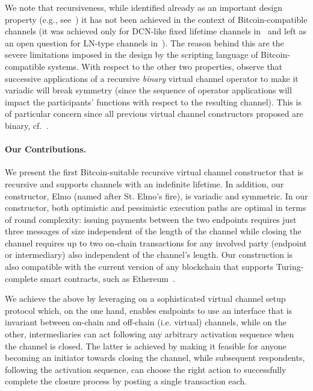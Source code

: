 We note that recursiveness, while identified already as an important design property (e.g., see~\cite{DBLP:conf/ccs/DziembowskiFH18}) it has not been achieved in the context of Bitcoin-compatible channels 
(it was achieved only for DCN-like fixed lifetime channels in~\cite{10.1007/978-3-030-65411-5_18} and left as an open question for LN-type channels in~\cite{cryptoeprint:2020:554}). 
The reason behind this are the severe limitations imposed in the design by the scripting language of Bitcoin-compatible systems. 
%
With respect to the other two properties, observe that successive applications of a recursive {\em binary} virtual channel operator to make it variadic will break symmetry (since the sequence of operator applications will impact the participants' functions with respect to the resulting channel). This is of particular concern since all previous virtual channel constructors proposed are binary, cf.~\cite{DBLP:conf/ccs/DziembowskiFH18,cryptoeprint:2020:554,10.1007/978-3-030-65411-5_18}. 

\paragraph{Our Contributions.}  We present  the first  Bitcoin-suitable
recursive virtual channel constructor that is recursive and supports channels
with an indefinite lifetime. In addition, our constructor, Elmo (named after St.
Elmo's fire), is variadic and symmetric. In our constructor, both optimistic and pessimistic execution paths are optimal in terms of round complexity: issuing payments between the two endpoints requires just three messages of size independent of the length of the channel while
closing the channel requires up to two on-chain transactions for any involved
party (endpoint or intermediary) also independent of the channel's length. Our
construction is also compatible with the current version of any blockchain that
supports Turing-complete smart contracts, such as
Ethereum~\cite{wood2014ethereumethereum}.

We achieve the above by leveraging on a sophisticated virtual channel setup
protocol which, on the one hand, enables endpoints to use an interface that is
invariant between on-chain and off-chain (i.e. virtual) channels,
while on the other, intermediaries can act following any arbitrary activation sequence when the channel is closed. The latter is achieved by making it feasible for anyone becoming an initiator towards closing the channel, while subsequent respondents, following the activation sequence, can choose the right action to successfully complete the closure process by posting a single transaction each. 

